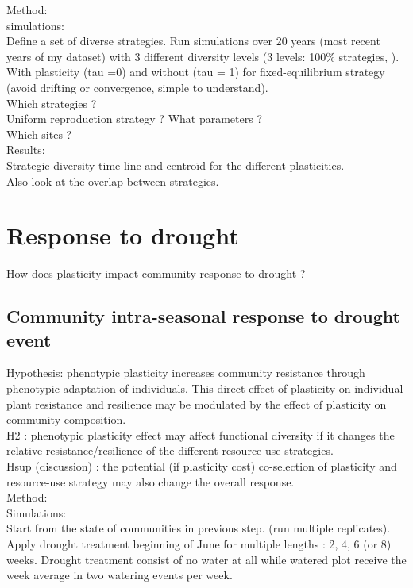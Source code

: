 \documentclass[review]{elsarticle}
\begin{document}
Method: \\
simulations:\\
Define a set of diverse strategies. Run simulations over 20 years (most recent years of my dataset) with 3 different diversity levels (3 levels: 100\% strategies, ). With plasticity (tau =0) and without (tau = 1) for fixed-equilibrium strategy (avoid drifting or convergence, simple to understand).\\

Which strategies ? \\
Uniform reproduction strategy ? What parameters ?\\
Which sites ?\\

Results:\\
Strategic diversity time line and centroïd for the different plasticities.\\
Also look at the overlap between strategies.\\

\section{Response to drought}
How does plasticity impact community response to drought ?

\subsection{Community intra-seasonal response to drought event}

Hypothesis: phenotypic plasticity increases community resistance through phenotypic adaptation of individuals. This direct effect of plasticity on individual plant resistance and resilience may be modulated by the effect of plasticity on community composition.\\
H2 : phenotypic plasticity effect may affect functional diversity if it changes the relative resistance/resilience of the different resource-use strategies.\\
Hsup (discussion) : the potential (if plasticity cost) co-selection of plasticity and resource-use strategy may also change the overall response.\\

Method:\\
Simulations:\\
Start from the state of communities in previous step. (run multiple replicates). Apply drought treatment beginning of June for multiple lengths : 2, 4, 6 (or 8) weeks. Drought treatment consist of no water at all while watered plot receive the week average in two watering events per week.\\
\end{document}
